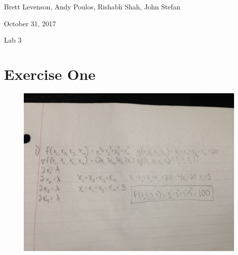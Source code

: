 \documentclass[11pt]{article}
\begin{document}
{\Large\noindent Brett Levenson, Andy Poulos, Rishabh Shah, John Stefan

\noindent October 31, 2017

\noindent Lab 3 \\}

\section*{Exercise One}
\begin{figure}[H]
	\centering
	\includegraphics[width=\textwidth]{One.JPG}
\end{figure}
\end{document}
